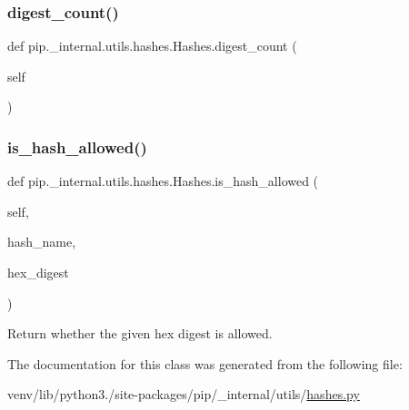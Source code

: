 \mbox{\label{classpip_1_1__internal_1_1utils_1_1hashes_1_1Hashes_a5366d1858938d41b9cb775beda6150c7}} 
\subsubsection{\texorpdfstring{digest\+\_\+count()}{digest\_count()}}
{\footnotesize\ttfamily def pip.\+\_\+internal.\+utils.\+hashes.\+Hashes.\+digest\+\_\+count (\begin{DoxyParamCaption}\item[{}]{self }\end{DoxyParamCaption})}

\mbox{\label{classpip_1_1__internal_1_1utils_1_1hashes_1_1Hashes_ab91477c7b3bc8018e23f7b489f8ac088}} 
\subsubsection{\texorpdfstring{is\+\_\+hash\+\_\+allowed()}{is\_hash\_allowed()}}
{\footnotesize\ttfamily def pip.\+\_\+internal.\+utils.\+hashes.\+Hashes.\+is\+\_\+hash\+\_\+allowed (\begin{DoxyParamCaption}\item[{}]{self,  }\item[{}]{hash\+\_\+name,  }\item[{}]{hex\+\_\+digest }\end{DoxyParamCaption})}

\begin{DoxyVerb}Return whether the given hex digest is allowed.\end{DoxyVerb}
 

The documentation for this class was generated from the following file\+:\begin{DoxyCompactItemize}
\item 
venv/lib/python3./site-\/packages/pip/\+\_\+internal/utils/\hyperlink{hashes_8py}{hashes.\+py}\end{DoxyCompactItemize}
